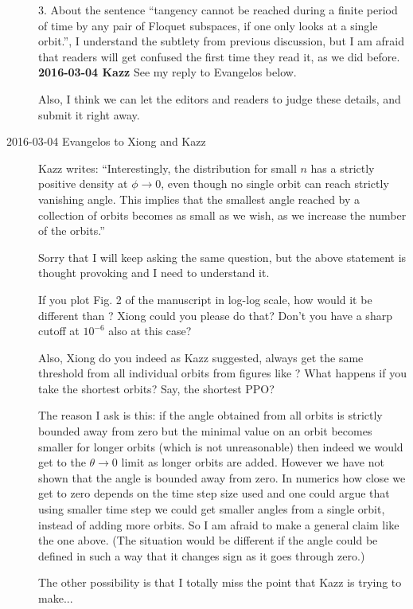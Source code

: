\begin{description}
3. About the sentence ``tangency
cannot be reached during a finite period of time by any pair of Floquet subspaces, if one
only looks at a single orbit.'', I understand the subtlety from previous
discussion, but I am
afraid that readers will get confused the first time they read it, as
we did before. \\
{\bf 2016-03-04 Kazz}
See my reply to Evangelos below.

Also, I think we can let the editors and readers to judge these details,
and submit it right away.

\item[2016-03-04 Evangelos to Xiong and Kazz]

Kazz writes: ``Interestingly, the distribution for small $n$ has a strictly
positive density at $\phi\to0$, even though no single orbit can reach strictly vanishing angle.
This implies that the smallest angle reached by a collection of orbits becomes as small as we wish,
as we increase the number of the orbits.''

Sorry that I will keep asking the same question,
but the above statement is thought provoking
and I need to understand it.

If you plot Fig. 2 of the manuscript
in log-log scale, how would it be different than ?
Xiong could you please do that? Don't you have a sharp
cutoff at $10^{-6}$ also at this case?

Also, Xiong do you indeed as Kazz suggested,
always get the same threshold from all individual
orbits from figures like ?
What happens if you take the shortest orbits?
Say, the shortest PPO?

The reason I ask is this:
if the angle obtained from all orbits is strictly
bounded away from zero
but the minimal value on an orbit
becomes smaller for longer orbits
(which is not unreasonable)
then indeed we would get to the $\theta\rightarrow 0$
limit as longer orbits are added.
However we have not shown that the angle is
bounded away from zero. In numerics how close
we get to zero depends
on the time step size used and one could argue that
using smaller time step we could get smaller angles
from a single orbit, instead of adding more orbits.
So I am afraid to make a general claim like the one
above.
(The situation would be different if the
angle could be defined in such a way that it changes
sign as it goes through zero.)

The other possibility is that I totally miss the point
that Kazz is trying to make...


\end{description}
